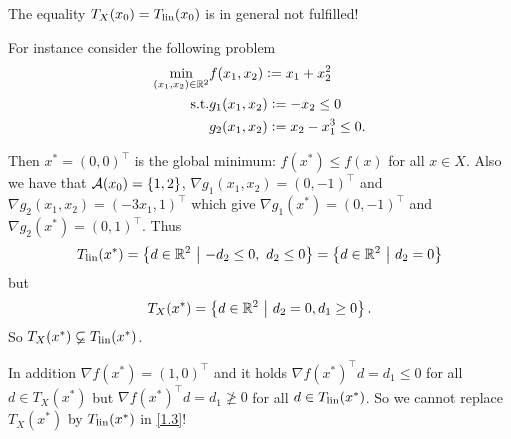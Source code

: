 \begin{example}\label{ex1.8}
    The equality \(T_X(x_0) = T_{\operatorname{lin}}(x_0)\) is in general not fulfilled!

    For instance consider the following problem
    \begin{align*}
        \min_{(x_1, x_2) \in \mathbb{R}^2} & f(x_1, x_2) \mathrel{\mathop:}= x_1 + x_2^2 \\
        \mathrm{s.t.} & g_1(x_1, x_2) \mathrel{\mathop:}= -x_2 \le 0 \\
        & g_2(x_1, x_2) \mathrel{\mathop:}= x_2 - x_1^3 \le 0.
    \end{align*}

    Then \(x^* = (0,0)^\top\) is the global minimum: \(f(x^*) \le f(x)\) for all \(x \in X\). Also we have that \(\mathcal{A}(x_0) = \{1,2\}\), \(\nabla g_1(x_1, x_2) = (0, -1)^\top\) and \(\nabla g_2 (x_1, x_2) = (-3 x_1, 1)^\top\) which give \(\nabla g_1(x^*) = (0, -1)^\top\) and \(\nabla g_2(x^*) = (0,1)^\top\). Thus \[T_{\lin}(x^*) = \left\{d \in \R^2 \ \middle| \ -d_2 \le 0 ,\ d_2 \le 0\right\} = \left\{d \in \R^2 \ \middle| \ d_2 = 0\right\}\] but \[T_X(x^*) = \left\{d \in \mathbb{R}^2 \ \middle| \ d_2 = 0, d_1 \ge 0\right\}.\] So \(T_X(x^*) \varsubsetneq T_{\operatorname{lin}}(x^*)\).

    In addition \(\nabla f(x^*) = (1,0)^\top\) and it holds \(\nabla f(x^*)^\top d = d_1 \le 0\) for all \(d \in T_X(x^*)\) but \(\nabla f(x^*)^\top d = d_1 \ngeq 0\) for all \(d \in T_{\operatorname{lin}}(x^*)\). So we cannot replace \(T_X(x^*)\) by \(T_{\operatorname{lin}}(x^*)\) in \eqref{1.3}!
\end{example}
